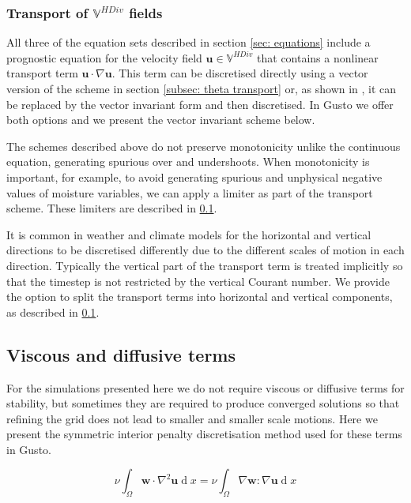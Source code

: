 \documentclass[journal abbreviation, manuscript]{copernicus}
\def\MM#1{\boldsymbol{#1}}
\DeclareMathOperator{\diff}{d}
\begin{document}
\subsubsection{Transport of $\mathbb{V}^{HDiv}$ fields}
All three of the equation sets described in section \ref{sec:
  equations} include a prognostic equation for the velocity field
$\MM{u}\in\mathbb{V}^{HDiv}$ that contains a nonlinear transport term
$\MM{u}\cdot\nabla\MM{u}$. This term can be discretised directly using
a vector version of the scheme in section \ref{subsec: theta
  transport} or, as shown in \citet{}, it can be replaced by the vector
invariant form and then discretised. In Gusto we offer both options
and we present the vector invariant scheme below.



The schemes described above do not preserve monotonicity unlike the
continuous equation, generating spurious over and undershoots. When
monotonicity is important, for example, to avoid generating spurious
and unphysical negative values of moisture variables, we can apply a
limiter as part of the transport scheme. These limiters are described
in \ref{}.

It is common in weather and climate models for the horizontal and
vertical directions to be discretised differently due to the different
scales of motion in each direction. Typically the vertical part of the
transport term is treated implicitly so that the timestep is not
restricted by the vertical Courant number. We provide the option to
split the transport terms into horizontal and vertical components, as
described in \ref{}.

\subsection{Viscous and diffusive terms}

For the simulations presented here we do not require viscous or
diffusive terms for stability, but sometimes they are required to
produce converged solutions so that refining the grid does not
lead to smaller and smaller scale motions. Here we present the symmetric
interior penalty discretisation method used for these terms in Gusto.

\begin{equation}
  \nu\int_\Omega\MM{w}\cdot\nabla^2\MM{u}\diff x = \nu\int_\Omega\nabla\MM{w}:\nabla\MM{u}\diff x
\end{equation}
\end{document}
